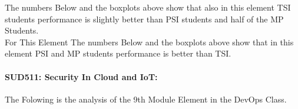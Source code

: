 \documentclass[12pt]{extreport}
\begin{document}
\begin{comment}

\begin{enumerate}	
	\item The MP Class Box-Plot:
	\begin{enumerate}
		\item MAX = a {} {} {} {} {} {} {} {} UQ = b {} {} {} {} {} {} {} {} Median = c
		\item LQ = d {} {} {} {} {} {} {} {}  MIN =	l {} {} {} {} {} {} {} {}  IQR = e - f = g
	\end{enumerate}
	\item The PSI Class Box-Plot:
	\begin{enumerate}
		\item MAX = a {} {} {} {} {} {} {} {} UQ = b {} {} {} {} {} {} {} {} Median = c
		\item LQ = d {} {} {} {} {} {} {} {}  MIN =	e {} {} {} {} {} {} {} {} IQR = f - g = h	
	\end{enumerate}
	\item The TSI Class Box-Plot:
	\begin{enumerate}
		\item MAX = a {} {} {} {} {} {} {} {} UQ = b {} {} {} {} {} {} {} {} Median = c
		\item LQ = d {} {} {} {} {} {} {} {} MIN = e {} {} {} {} {} {} {} {} IQR = f - g = h	
	\end{enumerate}
\end{enumerate}

\end{comment}




The numbers Below and the boxplots above show that also in this element  TSI students performance is slightly better than PSI students and half of the MP Students.\\

For This Element The numbers Below and the boxplots above show that in this element  PSI and MP students performance is  better than TSI.





\paragraph{\large SUD511: Security In Cloud and IoT:\\
} 
The Folowing is the analysis of the 9th Module Element in the DevOps Class.
\end{document}
